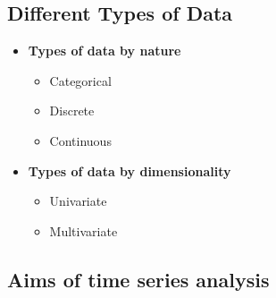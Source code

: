 \documentclass[dvipsnames,12pt]{book}
\begin{document}
            \subsection{Different Types of Data}

                \begin{itemize}
                    \item \textbf{Types of data by nature}
                        \begin{itemize}
                            \item Categorical
                            \item Discrete
                            \item Continuous
                        \end{itemize}
                    \item \textbf{Types of data by dimensionality}
                        \begin{itemize}
                            \item Univariate
                            \item Multivariate
                        \end{itemize}
                \end{itemize}

            \subsection{Aims of time series analysis}
\end{document}
